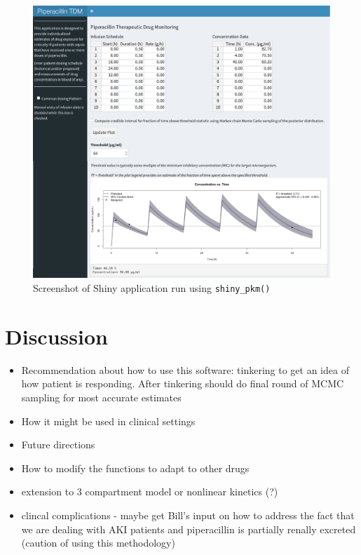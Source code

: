 \documentclass{article}\usepackage[]{graphicx}\usepackage[]{color}
\begin{document}

\begin{figure}
\caption{Screenshot of Shiny application run using \texttt{shiny_pkm()}}

\includegraphics[scale=0.7]{appscreenshot.pdf}

\end{figure}


\section{Discussion}

\begin{itemize}

  \item Recommendation about how to use this software: tinkering to get an idea of how patient is responding. After tinkering should do final round of MCMC sampling for most accurate estimates
  \item How it might be used in clinical settings
  \item Future directions
  \item How to modify the functions to adapt to other drugs
  \item extension to 3 compartment model or nonlinear kinetics (?)
  \item clincal complications - maybe get Bill's input on how to address the fact that we are dealing with AKI patients and piperacillin is partially renally excreted (caution of using this methodology)

\end{itemize}
\end{document}
